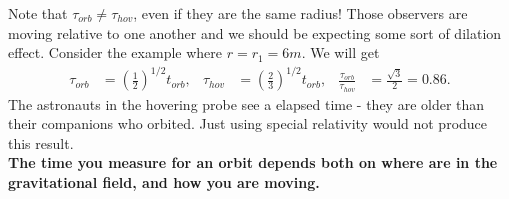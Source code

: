 \documentclass[a4paper, 11pt, normalem]{report}
\begin{document}
Note that $\tau_{orb}\neq\tau_{hov}$, even if they are the same radius!
Those observers are moving relative to one another and we should be expecting some sort of dilation effect.
Consider the example where $r=r_1=6m$.
We will get
\begin{align}
    \tau_{orb} &= \left(\frac12\right)^{1/2}t_{orb}, & \tau_{hov} &= \left(\frac23\right)^{1/2}t_{orb}, & \frac{\tau_{orb}}{\tau_{hov}} &= \frac{\sqrt{3}}{2} = 0.86.
\end{align}
The astronauts in the hovering probe see a  elapsed time - they are older than their companions who orbited. 
Just using special relativity would not produce this result. \\
\textbf{The time you measure for an orbit depends both on where are in the gravitational field, and how you are moving.}
\end{document}
